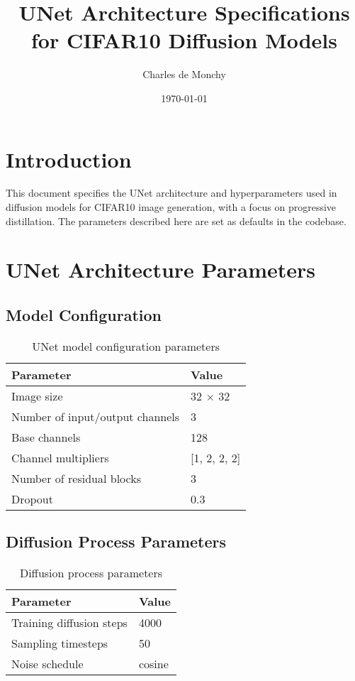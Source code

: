 \documentclass{article}
\title{UNet Architecture Specifications for CIFAR10 Diffusion Models}
\author{Charles de Monchy}
\date{\today}
\begin{document}
\maketitle

\section{Introduction}
This document specifies the UNet architecture and hyperparameters used in diffusion models for CIFAR10 image generation, with a focus on progressive distillation. The parameters described here are set as defaults in the codebase.

\section{UNet Architecture Parameters}
\subsection{Model Configuration}
\begin{table}[h]
\centering
\begin{tabular}{ll}
\toprule
\textbf{Parameter} & \textbf{Value} \\
\midrule
Image size & 32 $\times$ 32 \\
Number of input/output channels & 3 \\
Base channels & 128 \\
Channel multipliers & [1, 2, 2, 2] \\
Number of residual blocks & 3 \\
Dropout & 0.3 \\
\bottomrule
\end{tabular}
\caption{UNet model configuration parameters}
\label{tab:model_config}
\end{table}

\subsection{Diffusion Process Parameters}
\begin{table}[h]
\centering
\begin{tabular}{ll}
\toprule
\textbf{Parameter} & \textbf{Value} \\
\midrule
Training diffusion steps & 4000 \\
Sampling timesteps & 50 \\
Noise schedule & cosine \\
\bottomrule
\end{tabular}
\caption{Diffusion process parameters}
\label{tab:diffusion_params}
\end{table}
\end{document}

